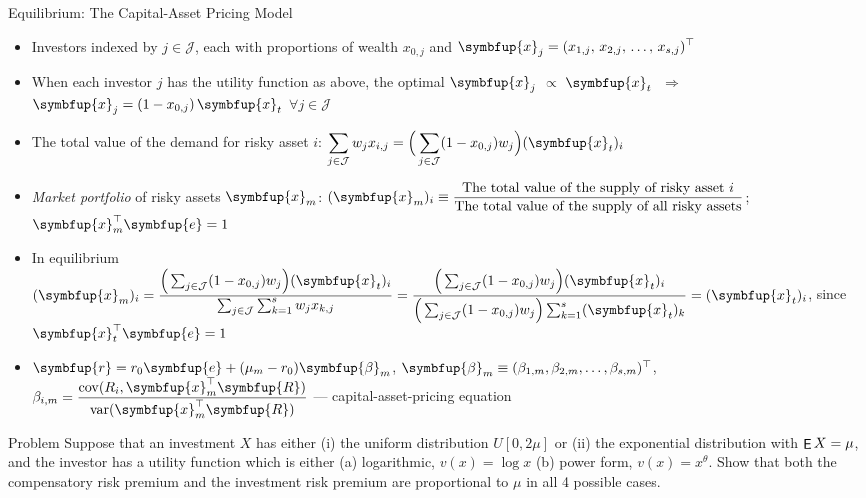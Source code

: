 \documentclass[10pt]{beamer}
\newcommand{\ds}{\displaystyle}
\newcommand{\ie}{\;\Longrightarrow\;}
\newcommand{\vx}{\symbfup{x}}
\newcommand{\vbb}{\symbfup{\beta}}
\newcommand{\vR}{\symbfup{R}}
\newcommand{\ve}{\symbfup{e}}
\newcommand{\vr}{\symbfup{r}}
\DeclareMathOperator\expc{{\sf E}}
\DeclareMathOperator\var{var}
\DeclareMathOperator\cov{cov}
\theoremstyle{definition}
\begin{document}
\begin{frame}{Equilibrium: The Capital-Asset Pricing Model}
  \begin{itemize}
    \item Investors indexed by $\ds j\in\mathcal{J}$, each with proportions of wealth $x_{0, j}$ and $\ds\vx_j = (x_{1, j},\,x_{2, j},\,\ldots,\,x_{s, j})^\top$ 
    \item When each investor $j$ has the utility function as above, the optimal $\ds\vx_j$ $\propto$ $\ds\vx_t$ $\ie$ $\ds\vx_j = (1 - x_{0, j})\,\vx_t$ $\forall j\in\mathcal{J}$
    \item The total value of the demand for risky asset $i$: $\ds\sum_{j\in\mathcal{J}} w_j x_{i, j} = \Big(\sum_{j\in\mathcal{J}}(1 - x_{0, j})w_j\Big)(\vx_t)_i$ 
    \item \emph{Market portfolio} of risky assets $\vx_m$: $\ds (\vx_m)_i\equiv\frac{\text{The total value of the supply of risky asset $i$}}{\text{The total value of the supply of all risky assets}}$; $\vx^\top_m\ve = 1$
    \item In equilibrium $\ds(\vx_m)_i =  \frac{\Big(\sum_{j\in\mathcal{J}}(1 - x_{0, j})w_j\Big)(\vx_t)_i}{\sum_{j\in\mathcal{J}}\sum_{k=1}^s w_j x_{k, j}} = \frac{\Big(\sum_{j\in\mathcal{J}}(1 - x_{0, j})w_j\Big)(\vx_t)_i}{\Big(\sum_{j\in\mathcal{J}}(1 - x_{0, j})w_j\Big)\sum_{k=1}^s(\vx_t)_k} = (\vx_t)_i$, since $\vx^\top_t\ve = 1$
    \item $\vr = r_0\ve + (\mu_m - r_0)\vbb_m$, $\vbb_m\equiv(\beta_{1, m}, \beta_{2, m}, \ldots, \beta_{s, m})^\top$, $\ds\beta_{i, m} = \frac{\cov(R_i, \vx^\top_m\vR)}{\var(\vx^\top_m\vR)}$ --- capital-asset-pricing equation
  \end{itemize}
\end{frame}

\begin{frame}{Problem}
  Suppose that an investment $X$ has either (i) the uniform distribution $U[0, 2\mu]$ or (ii) the exponential distribution with $\expc X = \mu$, and the investor has a utility function which is either (a) logarithmic, $v(x) = \log x$ (b) power form, $v(x) = x^\theta$. Show that both the compensatory risk premium and the investment risk premium are proportional to $\mu$ in all 4 possible cases.
\end{frame}
\end{document}
